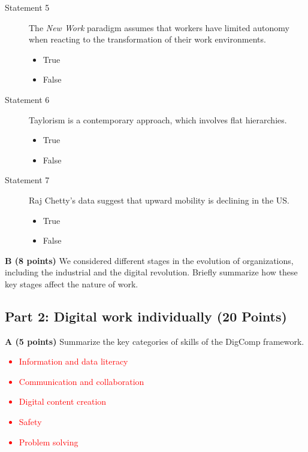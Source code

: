 \documentclass[12pt]{scrartcl}
\begin{document}
\begin{description}
	\item[Statement 5] The \textit{New Work} paradigm assumes that workers have limited autonomy when reacting to the transformation of their work environments.

	\begin{multicols}{2}
		\begin{itemize}[label={\Square}]
			\item True
			\item[\checkmark] False
		\end{itemize}
	\end{multicols}

	\item[Statement 6] Taylorism is a contemporary approach, which involves flat hierarchies.

	\begin{multicols}{2}
		\begin{itemize}[label={\Square}]
			\item True
			\item[\checkmark] False
		\end{itemize}
	\end{multicols}


	\item[Statement 7 ] Raj Chetty's data suggest that upward mobility is declining in the US.

	\begin{multicols}{2}
		\begin{itemize}[label={\Square}]
			\item[\checkmark] True
			\item False
		\end{itemize}
	\end{multicols}


\end{description}

\textbf{B (8 points)} We considered different stages in the evolution of organizations, including the industrial and the digital revolution. Briefly summarize how these key stages affect the nature of work.

\subsection*{Part 2: Digital work individually (20 Points)}

\textbf{A (5 points)} Summarize the key categories of skills of the DigComp framework.

\textcolor{red}{
\begin{itemize}
	\item Information and data literacy
	\item Communication and collaboration
	\item Digital content creation
	\item Safety
	\item Problem solving
\end{itemize}	
}
\end{document}
